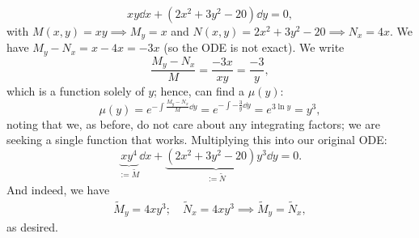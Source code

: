 \begin{example}
    \[
    xy \dd{x} + (2x^2 + 3y^2 - 20)\dd{y} = 0,    
    \]
    with $M(x, y) = xy \implies M_y = x$ and $N(x, y) = 2x^2 + 3y^2 - 20 \implies N_x = 4x$. We have $M_y - N_x = x - 4x = -3x$ (so the ODE is not exact). We write \[
    \frac{M_y-N_x}{M} = \frac{-3x}{xy} = \frac{-3}{y},    
    \]
    which is a function solely of $y$; hence, can find a $\mu(y)$:
    \[
    \mu(y) = e^{-\int \frac{M_y - N_x}{M} \dd{y}} = e^{- \int - \frac{3}{y}\dd{y}} = e^{3 \ln y} = y^3,
    \]
    noting that we, as before, do not care about any integrating factors; we are seeking a single function that works. Multiplying this into our original ODE:
    \[
    \underbrace{xy^4}_{:= \tilde{M}} \dd{x} + \underbrace{(2x^2 + 3y^2 - 20)y^3}_{:= \tilde{N}}\dd{y} = 0.    
    \]
    And indeed, we have \begin{align*}
        \tilde{M}_y = 4xy^3; \quad \tilde{N}_x = 4xy^3 \implies \tilde{M}_y = \tilde{N}_x,
     \end{align*}
     as desired.
\end{example}
